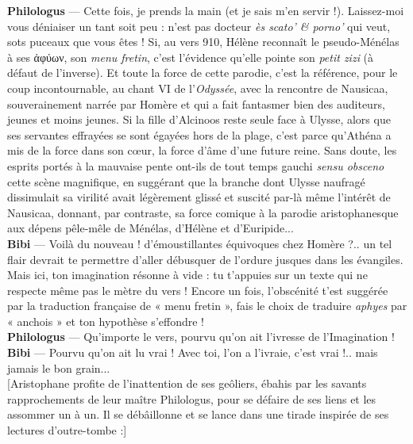 \documentclass{book}%
\newcommand{\italique}[1]{\textit{#1}}%
\newcommand{\espace}[1]{\hspace{#1}}%
\newlength{\larg}%
\newcommand{\decalageN}[1]{%
\settowidth{\larg}{#1}%
\espace{-\larg}%
}
\newcommand{\perso}[1]{\decalageN{\textbf{#1} --- }\textbf{#1}}%
\begin{document}
\perso{Philologus} — Cette fois, je prends la main (et je sais m'en servir !). Laissez-moi vous déniaiser un tant soit peu : n'est pas docteur \italique{ès scato' \& porno'} qui veut, sots puceaux que vous êtes ! Si, au vers 910, Hélène reconnaît le pseudo-Ménélas à ses ἀφύων, son \italique{menu fretin}, c'est l'évidence qu'elle pointe son \italique{petit zizi} (à défaut de l'inverse). Et toute la force de cette parodie, c'est la référence, pour le coup incontournable, au chant VI de l'\italique{Odyssée}, avec la rencontre de Nausicaa, souverainement narrée par Homère et qui a fait fantasmer bien des auditeurs, jeunes et moins jeunes. Si la fille d’Alcinoos reste seule face à Ulysse, alors que ses servantes effrayées se sont égayées hors de la plage, c’est parce qu’Athéna a mis de la force dans son cœur, la force d’âme d’une future reine. Sans doute, les esprits portés à la mauvaise pente ont-ils de tout temps gauchi \italique{sensu obsceno} cette scène magnifique, en suggérant que la branche dont Ulysse naufragé dissimulait sa virilité avait légèrement glissé et suscité par-là même l’intérêt de Nausicaa, donnant, par contraste, sa force comique à la parodie aristophanesque aux dépens pêle-mêle de Ménélas, d’Hélène et d’Euripide... \\

\perso{Bibi} — Voilà du nouveau ! d'émoustillantes équivoques chez Homère ?.. un tel flair devrait te permettre d'aller débusquer de l'ordure jusques dans les évangiles. Mais ici, ton imagination résonne à vide : tu t'appuies sur un texte qui ne respecte même pas le mètre du vers ! Encore un fois, l'obscénité t'est suggérée par la traduction française de « menu fretin », fais le choix de traduire \italique{aphyes} par « anchois » et ton hypothèse s'effondre ! \\

\perso{Philologus} — Qu'importe le vers, pourvu qu'on ait l'ivresse de l'Imagination ! \\

\perso{Bibi} — Pourvu qu'on ait lu vrai ! Avec toi, l'on a l'ivraie, c'est vrai !.. mais jamais le bon grain... \\

[Aristophane profite de l'inattention de ses geôliers, ébahis par les savants rapprochements de leur maître Philologus, pour se défaire de ses liens et les assommer un à un. Il se débâillonne et se lance dans une tirade inspirée de ses lectures d'outre-tombe :] \\
\end{document}
